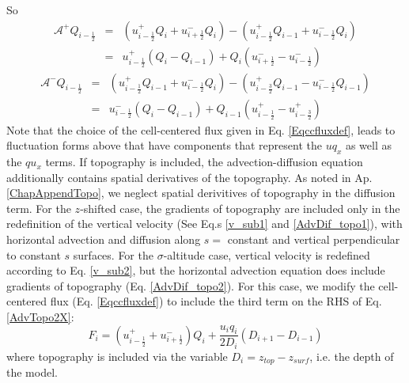 So
\begin{eqnarray}
\mathcal{A}^{+} Q_{i-\frac{1}{2}} &=&  
  \left( u^{+}_{i-\frac{1}{2}} Q_{i}   + u^{-}_{i+\frac{1}{2}} Q_{i} \right) -
  \left( u^{+}_{i-\frac{1}{2}} Q_{i-1} + u^{-}_{i-\frac{1}{2}} Q_{i} \right) \\
                                  &=& 
 u^{+}_{i-\frac{1}{2}} \left( Q_{i} - Q_{i-1} \right) +
                 Q_{i} \left( u^{-}_{i+\frac{1}{2}} - u^{-}_{i-\frac{1}{2}}  \right)
\end{eqnarray}
\begin{eqnarray}
\mathcal{A}^{-} Q_{i-\frac{1}{2}} &=&  
  \left( u^{+}_{i-\frac{1}{2}} Q_{i-1} + u^{-}_{i-\frac{1}{2}} Q_{i}   \right) -
  \left( u^{+}_{i-\frac{3}{2}} Q_{i-1} - u^{-}_{i-\frac{1}{2}} Q_{i-1} \right) \\
                                  &=& 
  u^{-}_{i-\frac{1}{2}} \left( Q_{i} - Q_{i-1} \right) +
                Q_{i-1} \left( u^{+}_{i-\frac{1}{2}} - u^{+}_{i-\frac{3}{2}}  \right)
\end{eqnarray}
Note that the choice of the cell-centered flux given in Eq. \ref{Eqccfluxdef},
leads to fluctuation forms above that have components that represent the $u q_x$
as well as the $q u_x$ terms.
If topography is included, the advection-diffusion equation additionally contains
spatial derivatives of the topography. As noted in Ap. \ref{ChapAppendTopo}, we neglect spatial
derivitives of topography in the diffusion term. For the $z$-shifted case, the gradients of
topography are included only in the redefinition of the vertical velocity (See
Eq.s \ref{v_sub1} and \ref{AdvDif_topo1}), with horizontal advection and diffusion
along $s = $ constant and vertical perpendicular to constant $s$ surfaces. For the
$\sigma$-altitude case, vertical velocity is redefined according to Eq. \ref{v_sub2},
but the horizontal advection equation does include gradients of topography
(Eq. \ref{AdvDif_topo2}). For this case, we modify the cell-centered flux (Eq. \ref{Eqccfluxdef})
to include the third term on the RHS of Eq. \ref{AdvTopo2X}:
\begin{equation}\label{EqccfluxdefTopo}
F_i = (u^{+}_{i-\frac{1}{2}} + u^{-}_{i+\frac{1}{2}})Q_i + \frac{u_i q_i}{2D_i}
\left( D_{i+1}-D_{i-1}\right)
\end{equation}
where topography is included via the variable $D_i=z_{top}-z_{surf}$, i.e. the depth of the model.

